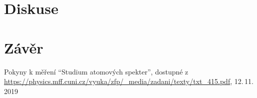 \documentclass{protokol}
\begin{document}
    \section*{Diskuse}



    \section*{Závěr}



    \begin{thebibliography}{}

        Pokyny k měření ``Studium atomových spekter'', dostupné z\\ \url{https://physics.mff.cuni.cz/vyuka/zfp/_media/zadani/texty/txt_415.pdf}, 12.\,11.\,2019

    \end{thebibliography}
\end{document}
